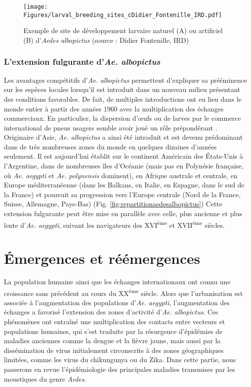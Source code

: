 \begin{figure}[t]
	\centering
	\texttt{[image: Figures/larval\_breeding\_sites\_cDidier\_Fontenille\_IRD.pdf]}
	\caption{Exemple de site de développement larvaire naturel (A) ou artificiel (B) d'{\em Aedes albopictus} (source : Didier Fontenille, IRD)}
	\label{fig:larval_breeding}
\end{figure}

\subsubsection{L'extension fulgurante d'{\em Ae. albopictus}}

Les avantages compétitifs d'{\em Ae. albopictus} permettent d'expliquer sa prééminence sur les espèces locales lorsqu'il est introduit dans un nouveau milieu présentant des conditions favorables.
De fait, de multiples introductions ont eu lieu dans le monde entier à partir des années 1960 avec la multiplication des échanges commerciaux.
En particulier, la dispersion d'\oe ufs ou de larves par le commerce international de pneus usagers semble avoir joué un rôle prépondérant \cite{reiter1998aedes}.
Originaire d'Asie, {\em Ae. albopictus} a ainsi été introduit et est devenu prédominant dans de très nombreuses zones du monde en quelques dizaines d'années seulement.
Il est aujourd'hui établit sur le continent Américain des États-Unis à l'Argentine, dans de nombreuses îles d'Océanie (mais pas en Polynésie française, où {\em Ae. aegypti} et {\em Ae. polynensis} dominent), en Afrique australe et centrale, en Europe méditerranéenne (dans les Balkans, en Italie, en Espagne, dans le sud de la France) et poursuit sa progression vers l'Europe centrale (Nord de la France, Suisse, Allemagne, Pays-Bas) (Fig. \ref{fig:repartitionaedesalbopictus}) \cite{kraemer2015global}
Cette extension fulgurante peut être mise en parallèle avec celle, plus ancienne et plus lente d'{\em Ae. aegypti}, suivant les navigateurs des XVI\textsuperscript{ème} et XVII\textsuperscript{ème} siècles.



\section{Émergences et réémergences}

La population humaine ainsi que les échanges internationaux ont connu une croissance sans précédent au cours du XX\textsuperscript{ème} siècle.
Alors que l'urbanisation est associée à l'augmentation des populations d'{\em Ae. aegypti}, l'augmentation des échanges a favorisé l'extension des zones d'activité d'{\em Ae. albopictus}. 
Ces phénomènes ont entraîné une multiplication des contacts entre vecteurs et populations humaines, qui s'est traduite par la résurgence d'épidémies de maladies anciennes comme la dengue et la fièvre jaune, mais aussi par la dissémination de virus initialement circonscrits à des zones géographiques limitées, comme les virus du chikungunya ou du Zika.
Dans cette partie, nous passerons en revue l'épidémiologie des principales maladies transmises par les moustiques du genre {\em Aedes}.

